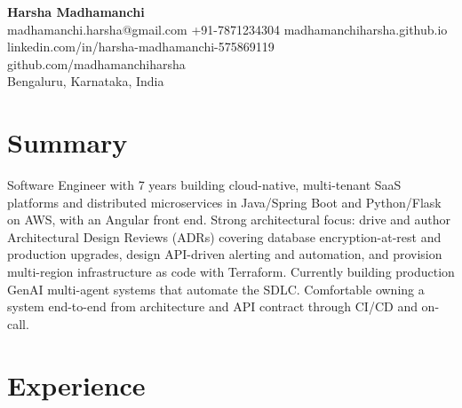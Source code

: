 \documentclass[11pt,a4paper]{article}
\begin{document}
\begin{center}
    {\LARGE\bfseries\color{primary} Harsha Madhamanchi}\\[-4pt]
    \small
    madhamanchi.harsha@gmail.com \quad
    +91-7871234304 \quad
    \textcolor{primary}{madhamanchiharsha.github.io} \\[2pt]
    \textcolor{primary}{linkedin.com/in/harsha-madhamanchi-575869119} \quad
    \textcolor{primary}{github.com/madhamanchiharsha} \\[2pt]
    Bengaluru, Karnataka, India
\end{center}

\vspace{-4pt}
\section{Summary}
\noindent
Software Engineer with 7 years building cloud-native, multi-tenant SaaS platforms and distributed microservices in Java/Spring Boot and Python/Flask on AWS, with an Angular front end. Strong architectural focus: drive and author Architectural Design Reviews (ADRs) covering database encryption-at-rest and production upgrades, design API-driven alerting and automation, and provision multi-region infrastructure as code with Terraform. Currently building production GenAI multi-agent systems that automate the SDLC. Comfortable owning a system end-to-end from architecture and API contract through CI/CD and on-call.

\section{Experience}
\end{document}
